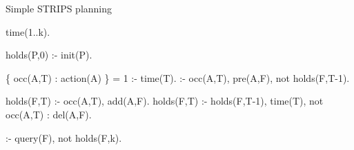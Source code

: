 \begin{frame}[fragile,shrink=1]{Simple STRIPS planning}
\begin{semiverbatim}
time(1..k).

holds(P,0) :- init(P).

\{ occ(A,T) : action(A) \} = 1 :- time(T).
:- occ(A,T), pre(A,F), not holds(F,T-1).

holds(F,T) :- occ(A,T), add(A,F).
holds(F,T) :- holds(F,T-1), time(T), not occ(A,T) : del(A,F).

:- query(F), not holds(F,k).


\end{semiverbatim}
\end{frame}
%
